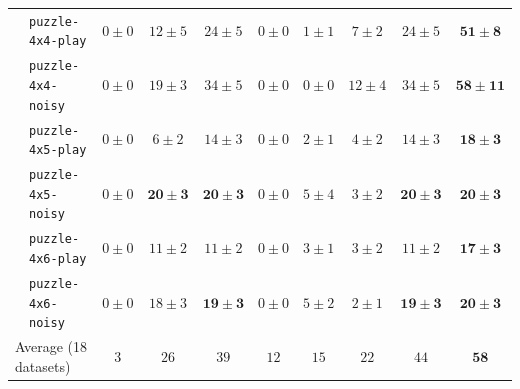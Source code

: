 \begin{tabular}{llcccccccc}
 & \texttt{puzzle-4x4-play} & $0 \pm 0$ & $12 \pm 5$ & $24 \pm 5$ & $0 \pm 0$ & $1 \pm 1$ & $7 \pm 2$ & $24 \pm 5$ & $\mathbf{51 \pm 8}$ \\
 & \texttt{puzzle-4x4-noisy} & $0 \pm 0$ & $19 \pm 3$ & $34 \pm 5$ & $0 \pm 0$ & $0 \pm 0$ & $12 \pm 4$ & $34 \pm 5$ & $\mathbf{58 \pm 11}$ \\
 & \texttt{puzzle-4x5-play} & $0 \pm 0$ & $6 \pm 2$ & $14 \pm 3$ & $0 \pm 0$ & $2 \pm 1$ & $4 \pm 2$ & $14 \pm 3$ & $\mathbf{18 \pm 3}$ \\
 & \texttt{puzzle-4x5-noisy} & $0 \pm 0$ & $\mathbf{20 \pm 3}$ & $\mathbf{20 \pm 3}$ & $0 \pm 0$ & $5 \pm 4$ & $3 \pm 2$ & $\mathbf{20 \pm 3}$ & $\mathbf{20 \pm 3}$ \\
 & \texttt{puzzle-4x6-play} & $0 \pm 0$ & $11 \pm 2$ & $11 \pm 2$ & $0 \pm 0$ & $3 \pm 1$ & $3 \pm 2$ & $11 \pm 2$ & $\mathbf{17 \pm 3}$ \\
 & \texttt{puzzle-4x6-noisy} & $0 \pm 0$ & $18 \pm 3$ & $\mathbf{19 \pm 3}$ & $0 \pm 0$ & $5 \pm 2$ & $2 \pm 1$ & $\mathbf{19 \pm 3}$ & $\mathbf{20 \pm 3}$ \\
\midrule
\multicolumn{2}{l}{Average (18 datasets)} & $3$ & $26$ & $39$ & $12$ & $15$ & $22$ & $44$ & $\mathbf{58}$ \\
\bottomrule
\end{tabular}
